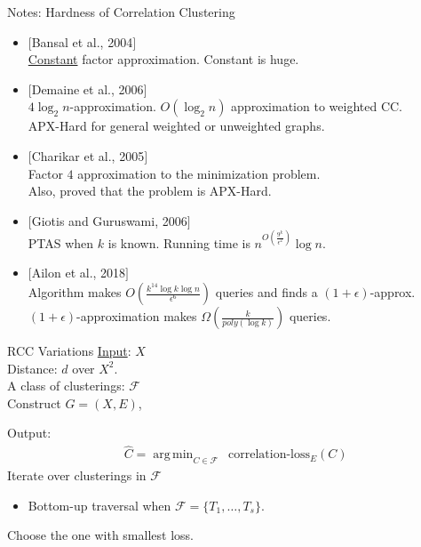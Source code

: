 \documentclass{beamer}
\newcommand{\mc}{\mathcal}
\DeclareMathOperator*{\argmin}{arg\,min}
\begin{document}
\begin{frame}[label=notesCCHardness]{Notes: Hardness of Correlation Clustering}
	\begin{itemize}
	\item $[$Bansal et al., 2004$]$\\
	\hyperlink{CCHardness}{Constant} factor approximation. Constant is huge. 
	\item $[$Demaine et al., 2006$]$\\
	$4\log_2 n$-approximation. $O(\log_2 n)$ approximation to weighted CC.\\
	APX-Hard for general weighted or unweighted graphs.
	\item $[$Charikar et al., 2005$]$\\
	Factor $4$ approximation to the minimization problem.\\
	Also, proved that the problem is APX-Hard. 
	\item $[$Giotis and Guruswami, 2006$]$\\
	PTAS when $k$ is known. Running time is $n^{O(\frac{9^k}{\epsilon^2})}\log n$.	
	\item $[$Ailon et al., 2018$]$\\
	Algorithm makes $O(\frac{k^{14} \log k\log n}{\epsilon^6})$ queries  and finds a $(1+\epsilon)$-approx. \\
	$(1+\epsilon)$-approximation makes $\Omega(\frac{k}{poly(\log k)})$ queries. 
\end{itemize}
\end{frame}

\begin{frame}[label=RCCVariations]{RCC Variations}
	\hyperlink{RCC}{Input}: $X$\\
	Distance: $d$ over $X^2$.\\
	A class of clusterings: $\mc F$\\
	
	Construct $G = (X, E)$, 
	
	\vspace{10pt}Output: 
	\vspace{-10pt}\begin{align*}
	  &\hat C = \argmin_{C \in \mc F} \enspace \text{correlation-loss}_{E}(C)
	\end{align*}
	Iterate over clusterings in $\mc F$		
	\begin{itemize}
		\item Bottom-up traversal when $\mc F = \{T_1, \ldots, T_s\}$.
	\end{itemize}
	Choose the one with smallest loss.
\end{frame}
\end{document}
